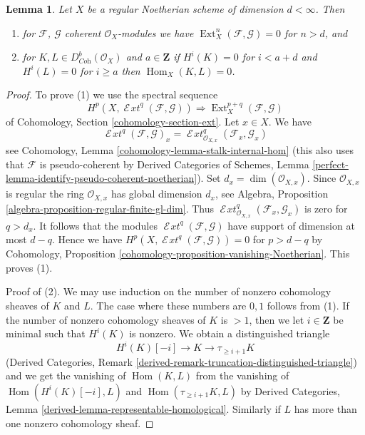 \documentclass{stacks-project}
\theoremstyle{plain}
\newtheorem{lemma}[subsection]{Lemma}
\theoremstyle{definition}
\theoremstyle{remark}
\numberwithin{equation}{subsection}
\def\Hom{\mathop{\mathrm{Hom}}\nolimits}
\def\Ext{\mathop{\mathrm{Ext}}\nolimits}
\def\SheafExt{\mathop{\mathcal{E}\!\mathit{xt}}\nolimits}
\begin{document}
\begin{lemma}
\label{lemma-Ext-0-regular}
Let $X$ be a regular Noetherian scheme of dimension $d < \infty$. Then
\begin{enumerate}
\item for $\mathcal{F}$, $\mathcal{G}$ coherent $\mathcal{O}_X$-modules
we have $\Ext^n_X(\mathcal{F}, \mathcal{G}) = 0$ for $n > d$, and
\item for $K, L \in D^b_{\textit{Coh}}(\mathcal{O}_X)$ and $a \in \mathbf{Z}$
if $H^i(K) = 0$ for $i < a + d$ and $H^i(L) = 0$ for $i \geq a$ then
$\Hom_X(K, L) = 0$.
\end{enumerate}
\end{lemma}

\begin{proof}
To prove (1) we use the spectral sequence
$$
H^p(X, \SheafExt^q(\mathcal{F}, \mathcal{G})) \Rightarrow
\Ext^{p + q}_X(\mathcal{F}, \mathcal{G})
$$
of Cohomology, Section \ref{cohomology-section-ext}. Let $x \in X$.
We have
$$
\SheafExt^q(\mathcal{F}, \mathcal{G})_x =
\SheafExt^q_{\mathcal{O}_{X, x}}(\mathcal{F}_x, \mathcal{G}_x)
$$
see Cohomology, Lemma \ref{cohomology-lemma-stalk-internal-hom}
(this also uses that $\mathcal{F}$ is pseudo-coherent by
Derived Categories of Schemes, Lemma
\ref{perfect-lemma-identify-pseudo-coherent-noetherian}).
Set $d_x = \dim(\mathcal{O}_{X, x})$.
Since $\mathcal{O}_{X, x}$ is regular the ring
$\mathcal{O}_{X, x}$ has global dimension $d_x$, see
Algebra, Proposition \ref{algebra-proposition-regular-finite-gl-dim}.
Thus $\SheafExt^q_{\mathcal{O}_{X, x}}(\mathcal{F}_x, \mathcal{G}_x)$
is zero for $q > d_x$. It follows that the modules
$\SheafExt^q(\mathcal{F}, \mathcal{G})$ have support
of dimension at most $d - q$. Hence we have
$H^p(X, \SheafExt^q(\mathcal{F}, \mathcal{G})) = 0$ for $p > d - q$
by Cohomology, Proposition \ref{cohomology-proposition-vanishing-Noetherian}.
This proves (1).

\medskip\noindent
Proof of (2).
We may use induction on the number of nonzero cohomology sheaves
of $K$ and $L$. The case where these numbers are $0, 1$ follows
from (1). If the number of nonzero cohomology sheaves of $K$
is $> 1$, then we let $i \in \mathbf{Z}$ be minimal such that
$H^i(K)$ is nonzero. We obtain a distinguished triangle
$$
H^i(K)[-i] \to K \to \tau_{\geq i + 1}K
$$
(Derived Categories, Remark
\ref{derived-remark-truncation-distinguished-triangle})
and we get the vanishing of $\Hom(K, L)$ from the vanishing
of $\Hom(H^i(K)[-i], L)$ and $\Hom(\tau_{\geq i + 1}K, L)$
by Derived Categories, Lemma \ref{derived-lemma-representable-homological}.
Similarly if $L$ has more than one nonzero cohomology sheaf.
\end{proof}
\end{document}
